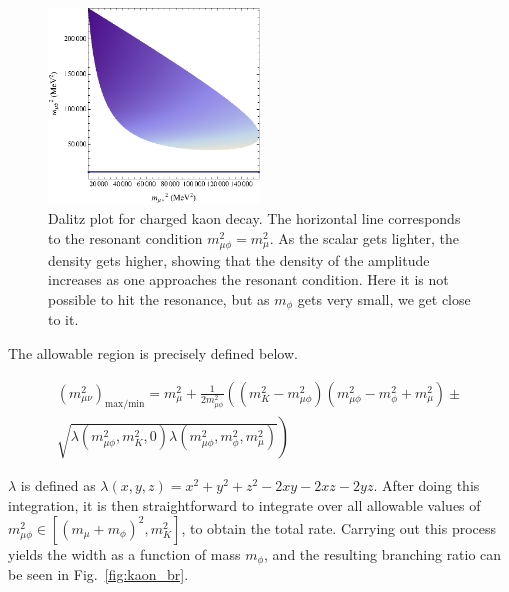 \begin{figure}[h]
    \centering
    \includegraphics[width=0.5\textwidth]{Figures/kaon/dalitz}
    \caption[Dalitz plot for charged kaon decay with the scalar.]{Dalitz plot for charged kaon decay. The horizontal line corresponds to the resonant condition $m_{\mu\phi}^2 = m_\mu^2$. As the scalar  gets lighter, the density gets higher, showing that the density of the amplitude increases as one approaches the resonant condition. Here it is not possible to hit the resonance, but as $m_\phi$ gets very small, we get close to it.}
    \label{fig:dalitz_plot}
\end{figure}

The allowable region is precisely defined below.

\begin{equation}
\begin{split}
    (m_{\mu\nu}^2)_\textrm{max/min} = m_\mu^2 + \frac{1}{2 m_{\mu\phi}^2} \left(\left(m_K^2 - m_{\mu\phi}^2\right)\left(m_{\mu\phi}^2 - m_\phi^2 + m_\mu^2\right) \pm \right. \\
    \left. \sqrt{\lambda\left(m_{\mu\phi}^2,m_K^2,0\right) \lambda\left(m_{\mu\phi}^2,m_\phi^2,m_\mu^2\right)}\right)
\end{split}
\end{equation}

\noindent $\lambda$ is defined as $\lambda(x,y,z) = x^2 + y^2 + z^2 - 2xy -2xz - 2yz$.
After doing this integration, it is then straightforward to integrate over all allowable values of $m_{\mu\phi}^2 \in [(m_\mu + m_\phi)^2, m_K^2]$, to obtain the total rate.
Carrying out this process yields the width as a function of mass $m_\phi$, and the resulting branching ratio can be seen in Fig.~\ref{fig:kaon_br}.

